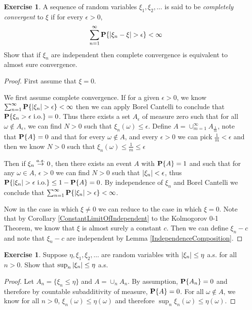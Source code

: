 \documentclass{amsart}
\theoremstyle{remark}
\theoremstyle{definition}
\newtheorem{ex}[thm]{Exercise}
\begin{document}
\begin{ex}A sequence of random variables $\xi_1, \xi_2, \dots$ is said
  to be \emph{completely convergent} to $\xi$ if for every $\epsilon > 0$,
\begin{align*}
\sum_{n=1}^\infty \textbf{P}\{\left \vert \xi_n - \xi \right \vert > \epsilon\} < \infty
\end{align*}
Show that if $\xi_n$ are independent then complete convergence is
equivalent to almost sure convergence.
\end{ex}
\begin{proof}
First assume that $\xi=0$.  

We first assume complete convergence.  If for a given $\epsilon > 0$, we know $\sum_{n=1}^\infty
\textbf{P}\{\left \vert \xi_n \right \vert > \epsilon\} < \infty$ then we can apply
Borel Cantelli to conclude that $\textbf{P}\{\xi_n > \epsilon \text{ i.o.}\} =
0$.  Thus there exists a set $A_\epsilon$ of measure zero such that
for all $\omega \notin A_\epsilon$, we can find $N>0$ such that
$\xi_n(\omega) \leq \epsilon$.  Define $A = \cup_{m=1}^\infty A_\frac{1}{m}$,
note that $\textbf{P}\{A\} = 0$ and that for every $\omega \notin A$,
and every $\epsilon >0$ we can pick $\frac{1}{m} < \epsilon$  and then
we know  $N>0$ such that $\xi_n(\omega) \leq \frac{1}{m} \leq \epsilon$

Then if $\xi_n \overset{a.s.}\to 0$, then there
exists an event $A$ with $\textbf{P}\{A\} = 1$ and such that for any
$\omega \in A$, $\epsilon>0$ we can find $N > 0$ such that
$\left \vert \xi_n \right \vert < \epsilon$, thus $\textbf{P}\{\left \vert \xi_n \right \vert > \epsilon
  \text{ i.o.}\} \leq 1 - \textbf{P}\{A\} = 0$.  By independence of
$\xi_n$ and Borel Cantelli we conclude that $\sum_{n=1}^\infty
\textbf{P}\{\left \vert \xi_n \right \vert > \epsilon\} < \infty$.

Now in the case in which $\xi \neq 0$ we can reduce to the case in
which $\xi = 0$.  Note that by Corollary
\ref{ConstantLimitOfIndependent} to the Kolmogorov 0-1 Theorem, we
know that $\xi$ is almost surely a constant $c$.  Then we can define $\xi_n
- c$ and note that $\xi_n - c$ are independent by Lemma \ref{IndependenceComposition}.
\end{proof}

\begin{ex}Suppose $\eta, \xi_1, \xi_2, \dots$ are random variables with
  $\left \vert \xi_n \right \vert \leq \eta$ a.s. for all $n > 0$.  Show that $\sup_n
  \left \vert \xi_n \right \vert \leq \eta$ a.s.
\end{ex}
\begin{proof}
Let $A_n = \lbrace \xi_n \leq \eta \rbrace$ and $A = \cup_n A_n$.
By assumption,
$\textbf{P}\{A_n\} =0$ and therefore by countable subadditivity of measure,
$\textbf{P}\{A\} = 0$.  For all $\omega \notin A$, we know for all
$n>0$, $\xi_n(\omega) \leq \eta(\omega)$ and therefore
$\sup_n\xi_n(\omega) \leq \eta(\omega)$.
\end{proof}
\end{document}
